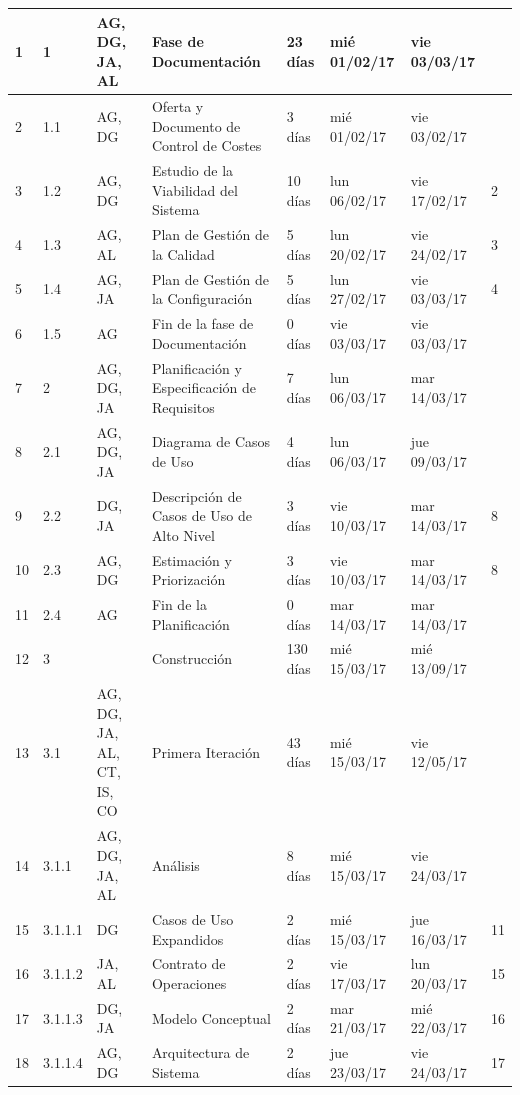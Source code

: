 \begin{center}
\begin{longtable}{  p{0.5cm}  p{1cm}  p{2cm}  p{4cm}  p{1.5cm}  p{2cm}  p{2cm}  p{2cm}  }
  1	&	1	&	AG, DG, JA, AL	&	Fase de Documentación	&	23 días	&	mié 01/02/17	&	vie 03/03/17	&		\\ \hline
2	&	1.1	&	AG, DG	&	   Oferta y Documento de Control de Costes	&	3 días	&	mié 01/02/17	&	vie 03/02/17	&		\\ \hline
3	&	1.2	&	AG, DG	&	   Estudio de la Viabilidad del Sistema	&	10 días	&	lun 06/02/17	&	vie 17/02/17	&	2	\\ \hline
4	&	1.3	&	AG, AL	&	   Plan de Gestión de la Calidad	&	5 días	&	lun 20/02/17	&	vie 24/02/17	&	3	\\ \hline
5	&	1.4	&	AG, JA	&	   Plan de Gestión de la Configuración 	&	5 días	&	lun 27/02/17	&	vie 03/03/17	&	4	\\ \hline
6	&	1.5	&	AG	&	   Fin de la fase de Documentación	&	0 días	&	vie 03/03/17	&	vie 03/03/17	&		\\ \hline
7	&	2	&	AG, DG, JA	&	Planificación y Especificación de Requisitos	&	7 días	&	lun 06/03/17	&	mar 14/03/17	&		\\ \hline
8	&	2.1	&	AG, DG, JA	&	   Diagrama de Casos de Uso	&	4 días	&	lun 06/03/17	&	jue 09/03/17	&		\\ \hline
9	&	2.2	&	DG, JA	&	   Descripción de Casos de Uso de Alto Nivel	&	3 días	&	vie 10/03/17	&	mar 14/03/17	&	8	\\ \hline
10	&	2.3	&	AG, DG	&	   Estimación y Priorización	&	3 días	&	vie 10/03/17	&	mar 14/03/17	&	8	\\ \hline
11	&	2.4	&	AG	&	   Fin de la Planificación	&	0 días	&	mar 14/03/17	&	mar 14/03/17	&		\\ \hline
12	&	3	&		&	Construcción	&	130 días	&	mié 15/03/17	&	mié 13/09/17	&		\\ \hline
13	&	3.1	&	AG, DG, JA, AL, CT, IS, CO	&	   Primera Iteración	&	43 días	&	mié 15/03/17	&	vie 12/05/17	&		\\ \hline
14	&	3.1.1	&	AG, DG, JA, AL	&	      Análisis	&	8 días	&	mié 15/03/17	&	vie 24/03/17	&		\\ \hline
15	&	3.1.1.1	&	DG	&	         Casos de Uso Expandidos	&	2 días	&	mié 15/03/17	&	jue 16/03/17	&	11	\\ \hline
16	&	3.1.1.2	&	JA, AL	&	         Contrato de Operaciones	&	2 días	&	vie 17/03/17	&	lun 20/03/17	&	15	\\ \hline
17	&	3.1.1.3	&	DG, JA	&	         Modelo Conceptual	&	2 días	&	mar 21/03/17	&	mié 22/03/17	&	16	\\ \hline
18	&	3.1.1.4	&	AG, DG	&	         Arquitectura de Sistema	&	2 días	&	jue 23/03/17	&	vie 24/03/17	&	17	\\ \hline

\end{longtable}
\end{center}

